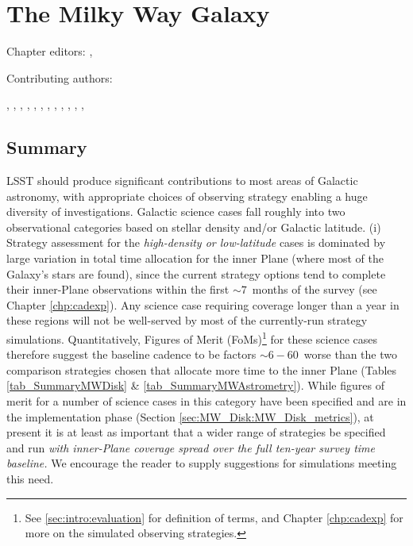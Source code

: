
\chapter[The Milky Way Galaxy]{The Milky Way Galaxy}
\def\chpname{galaxy}\label{chp:\chpname}

Chapter editors:
,

Contributing authors:

,
,
,
,
,
,
,
,
,
,
,
,

\section*{Summary}

LSST should produce significant contributions to most areas of
Galactic astronomy, with appropriate choices of observing strategy
enabling a huge diversity of investigations. Galactic science cases
fall roughly into two observational categories based on stellar
density and/or Galactic latitude. (i) Strategy assessment for the {\it
  high-density or low-latitude} cases is dominated by large variation
in total time allocation for the inner Plane (where most of the
Galaxy's stars are found), since the current strategy options tend to
complete their inner-Plane observations within the first $\sim
7$~months of the survey (see Chapter \ref{chp:cadexp}). Any science
case requiring coverage longer than a year in these regions will not
be well-served by most of the currently-run strategy simulations.
Quantitatively, Figures of Merit (FoMs)\footnote{See
  \autoref{sec:intro:evaluation} for definition of terms, and Chapter
  \ref{chp:cadexp} for more on the simulated observing strategies.  }
for these science cases therefore suggest the baseline cadence to be
factors $\sim 6-60$~worse than the two comparison strategies chosen
that allocate more time to the inner Plane (Tables
\ref{tab_SummaryMWDisk} \& \ref{tab_SummaryMWAstrometry}).  While
figures of merit for a number of science cases in this category have
been specified and are in the implementation phase (Section
\ref{sec:MW_Disk:MW_Disk_metrics}), at present it is at least as
important that a wider range of strategies be specified and run {\it
  with inner-Plane coverage spread over the full ten-year survey time
  baseline.} We encourage the reader to supply suggestions for
simulations meeting this need.

